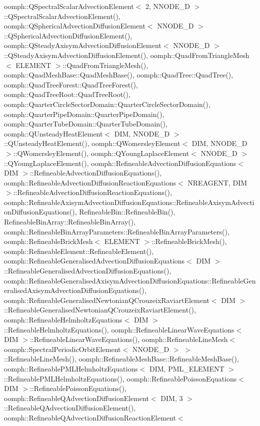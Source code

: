 oomph\+::\+Q\+Spectral\+Scalar\+Advection\+Element$<$ 2, N\+N\+O\+D\+E\+\_\+D $>$\+::\+Q\+Spectral\+Scalar\+Advection\+Element(), oomph\+::\+Q\+Spherical\+Advection\+Diffusion\+Element$<$ N\+N\+O\+D\+E\+\_\+D $>$\+::\+Q\+Spherical\+Advection\+Diffusion\+Element(), oomph\+::\+Q\+Steady\+Axisym\+Advection\+Diffusion\+Element$<$ N\+N\+O\+D\+E\+\_\+D $>$\+::\+Q\+Steady\+Axisym\+Advection\+Diffusion\+Element(), oomph\+::\+Quad\+From\+Triangle\+Mesh$<$ E\+L\+E\+M\+E\+N\+T $>$\+::\+Quad\+From\+Triangle\+Mesh(), oomph\+::\+Quad\+Mesh\+Base\+::\+Quad\+Mesh\+Base(), oomph\+::\+Quad\+Tree\+::\+Quad\+Tree(), oomph\+::\+Quad\+Tree\+Forest\+::\+Quad\+Tree\+Forest(), oomph\+::\+Quad\+Tree\+Root\+::\+Quad\+Tree\+Root(), oomph\+::\+Quarter\+Circle\+Sector\+Domain\+::\+Quarter\+Circle\+Sector\+Domain(), oomph\+::\+Quarter\+Pipe\+Domain\+::\+Quarter\+Pipe\+Domain(), oomph\+::\+Quarter\+Tube\+Domain\+::\+Quarter\+Tube\+Domain(), oomph\+::\+Q\+Unsteady\+Heat\+Element$<$ D\+I\+M, N\+N\+O\+D\+E\+\_\+D $>$\+::\+Q\+Unsteady\+Heat\+Element(), oomph\+::\+Q\+Womersley\+Element$<$ D\+I\+M, N\+N\+O\+D\+E\+\_\+D $>$\+::\+Q\+Womersley\+Element(), oomph\+::\+Q\+Young\+Laplace\+Element$<$ N\+N\+O\+D\+E\+\_\+D $>$\+::\+Q\+Young\+Laplace\+Element(), oomph\+::\+Refineable\+Advection\+Diffusion\+Equations$<$ D\+I\+M $>$\+::\+Refineable\+Advection\+Diffusion\+Equations(), oomph\+::\+Refineable\+Advection\+Diffusion\+Reaction\+Equations$<$ N\+R\+E\+A\+G\+E\+N\+T, D\+I\+M $>$\+::\+Refineable\+Advection\+Diffusion\+Reaction\+Equations(), oomph\+::\+Refineable\+Axisym\+Advection\+Diffusion\+Equations\+::\+Refineable\+Axisym\+Advection\+Diffusion\+Equations(), Refineable\+Bin\+::\+Refineable\+Bin(), Refineable\+Bin\+Array\+::\+Refineable\+Bin\+Array(), oomph\+::\+Refineable\+Bin\+Array\+Parameters\+::\+Refineable\+Bin\+Array\+Parameters(), oomph\+::\+Refineable\+Brick\+Mesh$<$ E\+L\+E\+M\+E\+N\+T $>$\+::\+Refineable\+Brick\+Mesh(), oomph\+::\+Refineable\+Element\+::\+Refineable\+Element(), oomph\+::\+Refineable\+Generalised\+Advection\+Diffusion\+Equations$<$ D\+I\+M $>$\+::\+Refineable\+Generalised\+Advection\+Diffusion\+Equations(), oomph\+::\+Refineable\+Generalised\+Axisym\+Advection\+Diffusion\+Equations\+::\+Refineable\+Generalised\+Axisym\+Advection\+Diffusion\+Equations(), oomph\+::\+Refineable\+Generalised\+Newtonian\+Q\+Crouzeix\+Raviart\+Element$<$ D\+I\+M $>$\+::\+Refineable\+Generalised\+Newtonian\+Q\+Crouzeix\+Raviart\+Element(), oomph\+::\+Refineable\+Helmholtz\+Equations$<$ D\+I\+M $>$\+::\+Refineable\+Helmholtz\+Equations(), oomph\+::\+Refineable\+Linear\+Wave\+Equations$<$ D\+I\+M $>$\+::\+Refineable\+Linear\+Wave\+Equations(), oomph\+::\+Refineable\+Line\+Mesh$<$ oomph\+::\+Spectral\+Periodic\+Orbit\+Element$<$ N\+N\+O\+D\+E\+\_\+D $>$ $>$\+::\+Refineable\+Line\+Mesh(), oomph\+::\+Refineable\+Mesh\+Base\+::\+Refineable\+Mesh\+Base(), oomph\+::\+Refineable\+P\+M\+L\+Helmholtz\+Equations$<$ D\+I\+M, P\+M\+L\+\_\+\+E\+L\+E\+M\+E\+N\+T $>$\+::\+Refineable\+P\+M\+L\+Helmholtz\+Equations(), oomph\+::\+Refineable\+Poisson\+Equations$<$ D\+I\+M $>$\+::\+Refineable\+Poisson\+Equations(), oomph\+::\+Refineable\+Q\+Advection\+Diffusion\+Element$<$ D\+I\+M, 3 $>$\+::\+Refineable\+Q\+Advection\+Diffusion\+Element(), oomph\+::\+Refineable\+Q\+Advection\+Diffusion\+Reaction\+Element$<$ 